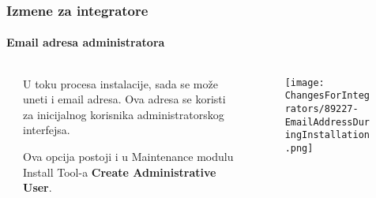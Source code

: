 \begin{frame}[fragile]
	\frametitle{Izmene za integratore}
	\framesubtitle{Email adresa administratora}

	\begin{columns}[T]
		\begin{column}{.04\textwidth}
		\end{column}
		\begin{column}{.38\textwidth}

			U toku procesa instalacije, sada se može uneti i email adresa.
			Ova adresa se koristi za inicijalnog korisnika administratorskog interfejsa.

			\vspace{0.2cm}

			Ova opcija postoji i u Maintenance modulu Install Tool-a
			\textbf{Create Administrative User}.

		\end{column}
		\begin{column}{.58\textwidth}
			\vspace{-0.3cm}
			\begin{figure}
				\texttt{[image: ChangesForIntegrators/89227-EmailAddressDuringInstallation.png]}
			\end{figure}
		\end{column}
	\end{columns}

\end{frame}



